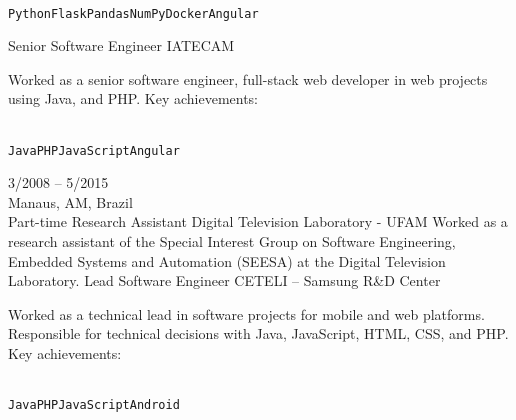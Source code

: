 \documentclass[9pt]{developercv} %
\begin{document}
\begin{entrylist}
{\begin{contributionlist}
    \end{contributionlist}\\
    \texttt{Python}\slashsep\texttt{Flask}\slashsep\texttt{Pandas}\slashsep\texttt{NumPy}\slashsep\texttt{Docker}\slashsep\texttt{Angular}}
  {Senior Software Engineer}
  {IATECAM}
  {
    Worked as a senior software engineer, full-stack web developer in web projects using Java, and PHP. Key achievements:\\
    \begin{contributionlist}
    \end{contributionlist}\\
    \texttt{Java}\slashsep\texttt{PHP}\slashsep\texttt{JavaScript}\slashsep\texttt{Angular}}
  \entry
  {3/2008 -- 5/2015\\\footnotesize{Manaus, AM, Brazil}\\\footnotesize{Part-time}}
  {Research Assistant}
  {Digital Television Laboratory - UFAM}
  {
    Worked as a research assistant of the Special Interest Group on Software Engineering, Embedded Systems and Automation (SEESA) at the Digital Television Laboratory.
  }
  {Lead Software Engineer}
  {CETELI -- Samsung R\&D Center}
  {
    Worked as a technical lead in software projects for mobile and web platforms. Responsible for technical decisions with Java, JavaScript, HTML, CSS, and PHP. Key achievements:\\
    \begin{contributionlist}
    \end{contributionlist}\\
    \texttt{Java}\slashsep\texttt{PHP}\slashsep\texttt{JavaScript}\slashsep\texttt{Android}}

\end{entrylist}
\end{document}
